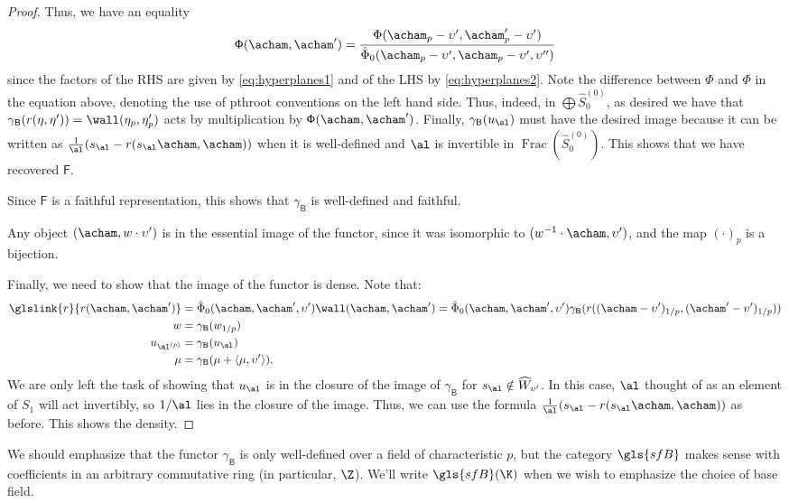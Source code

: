 \begin{proof}
Thus, we have an
equality  \[{\mathsf{\Phi}(\acham,\acham')}=\frac{{\Phi}(\acham_p-\upsilon',\acham'_p-\upsilon')}{\hat{\Phi}_0(\acham_p-\upsilon',\acham_p-\upsilon',\upsilon'')}\]
since the factors of the RHS are given by \eqref{eq:hyperplanes1} and
of the LHS by \eqref{eq:hyperplanes2}.
Note the difference between $\mathsf{\Phi}$ and $\Phi$ in the equation above, denoting the use of \gls{pthroot} conventions on the left hand side.  Thus, indeed, in $\bigoplus \widehat{S}_0^{(0)}$, as desired we have that $\gamma_{\mathsf{B}}(r(\eta,\eta'))=\wall(\eta_p,\eta_p')$ acts by multiplication by $\mathsf{\Phi}(\acham,\acham')$.  Finally, $\gamma_{\mathsf{B}}(u_\al)$ must have the desired image because it can be written as $\frac{1}{\al}(s_{\al}-r(s_\al\acham,\acham))$ when it is well-defined and $\al$ is invertible in $\operatorname{Frac}(\widehat{S}_0^{(0)}).$  This shows that we have recovered $\mathsf{F}$.

Since $\mathsf{F}$ is a faithful representation, this shows that $\gamma_{\mathsf{B}}$ is well-defined and faithful.

Any object $(\acham, w\cdot \upsilon')$ is in the essential image of
the functor, since it was isomorphic to $(w^{-1}\cdot \acham,
\upsilon')$, and the map $(\cdot)_p$ is a bijection. 

Finally, we need to show that the image of the functor is dense.
Note that:   \begin{align*}
  \glslink{r}{r(\acham,\acham')}  &=\hat{\Phi}_0(\acham,\acham',\upsilon')\wall(\acham,\acham')=
                            \hat{\Phi}_0(\acham,\acham',\upsilon')\gamma_{\mathsf{B}}(r((\acham-\upsilon')_{1/p},(\acham'-\upsilon')_{1/p}))\\
   w&=  \gamma_{\mathsf{B}} (w_{1/p})\\
   u_{\al^{(p)}}&=\gamma_{\mathsf{B}}(u_\al) \\
   \mu &=  \gamma_{\mathsf{B}}(\mu+\langle\mu,\upsilon'\rangle). 
  \end{align*}
We are only left the task of showing that $u_{\al}$ is
in the closure of the image of $\gamma_{\mathsf{B}}$ for $s_{\al}\notin \widehat{W}_{\upsilon'}$.  In this case, $\al$
thought of as an element of $S_1$ will act invertibly, so $1/\al$ lies in the closure of the image.   Thus, we can use the
formula $\frac{1}{\al}(s_{\al}-r(s_\al\acham,\acham))$ as before. This shows the density.
  \end{proof}


\begin{remark}\label{rem:coefficients}
  We should emphasize that the functor $\gamma_{\mathsf{B}}$ is only well-defined over a field of characteristic $p$, but the category $\gls{sfB}$  makes sense with coefficients in  an arbitrary commutative ring (in
  particular, $\Z$).  We'll write $\gls{sfB}(\K)$ when we wish to emphasize the choice of base field.  
\end{remark}


